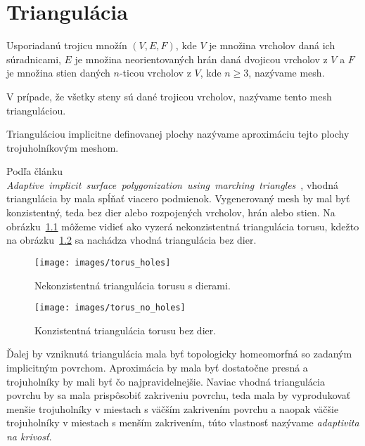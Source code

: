 \chapter{Triangulácia}
\label{kap:triangulation}

Usporiadanú trojicu množín $(V, E, F)$, kde $V$ je množina vrcholov daná ich súradnicami, 
$E$ je množina neorientovaných hrán daná 
dvojicou vrcholov z $V$ a $F$ je množina stien daných $n$-ticou vrcholov z $V$, kde $n \geq 3$, 
nazývame mesh.

V prípade, že všetky steny sú dané trojicou vrcholov, nazývame tento mesh trianguláciou.

Trianguláciou implicitne definovanej plochy nazývame aproximáciu tejto plochy trojuholníkovým meshom.

Podľa článku \mbox{\textit{Adaptive implicit surface polygonization using marching triangles} \cite{akkouche2001adaptive}},
vhodná triangulácia by mala spĺňať viacero podmienok. Vygenerovaný mesh by mal byť konzistentný, 
teda bez dier alebo rozpojených vrcholov, hrán alebo stien. Na \mbox{obrázku \ref{obr:torus_holes}}
môžeme vidieť ako vyzerá nekonzistentná triangulácia torusu, kdežto na 
\mbox{obrázku \ref{obr:torus_no_holes}} sa nachádza vhodná triangulácia bez dier. 

\begin{figure}
    \centerline{\texttt{[image: images/torus\_holes]}}
    \caption[Príklad nekonzistentnej triangulácie]{Nekonzistentná triangulácia torusu s dierami.}
    \label{obr:torus_holes}
\end{figure}

\begin{figure}
    \centerline{\texttt{[image: images/torus\_no\_holes]}}
    \caption[Príklad konzistentnej triangulácie]{Konzistentná triangulácia torusu bez dier.}
    \label{obr:torus_no_holes}
\end{figure}

Ďalej by vzniknutá triangulácia mala byť topologicky homeomorfná 
so zadaným implicitným povrchom. Aproximácia by mala byť dostatočne presná a trojuholníky by mali 
byť čo najpravidelnejšie. Naviac vhodná triangulácia povrchu by sa mala prispôsobiť zakriveniu povrchu,
teda mala by vyprodukovať menšie trojuholníky v miestach s väčším zakrivením povrchu a naopak väčšie
trojuholníky v miestach s menším zakrivením, túto vlastnosť nazývame \textit{adaptivita na krivosť}.

